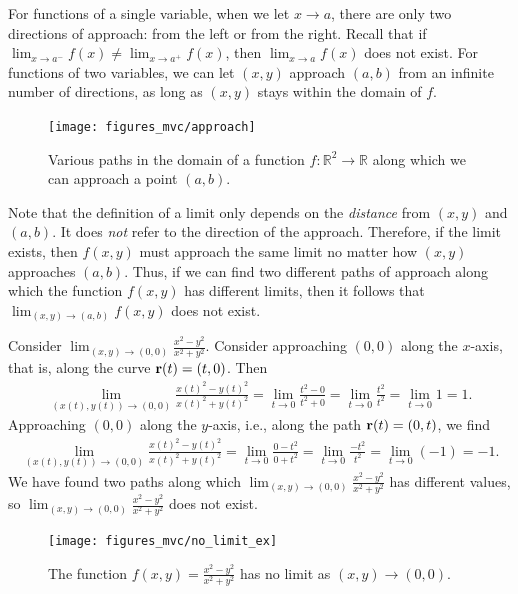 \documentclass[12pt,letterpaper,reqno]{article}
\numberwithin{equation}{section}
\newcommand{\R}{\ensuremath{\mathbb R}}
\newcommand{\bbr}{{\bf r}}
\begin{document}
{For functions of a single variable, when we let $x \to a$, there are only two directions of approach: from the left or from the right. Recall that if $\lim_{x \to a^-}f(x) \neq \lim_{x \to a^+}f(x)$, then $\lim_{x \to a}f(x)$ does not exist. For functions of two variables, we can let $(x,y)$ approach $(a,b)$ from an infinite number of directions, as long as $(x,y)$ stays within the domain of $f$.
	
\begin{figure}[h]
	\begin{center}
		\texttt{[image: figures\_mvc/approach]}
	\end{center}
	\caption{Various paths in the domain of a function $f:\R^2 \to \R$ along which we can approach a point $(a,b)$.}
\end{figure}	
	
	
Note that the definition of a limit only depends on the \emph{distance} from $(x,y)$ and $(a,b)$. It does \emph{not} refer to the direction of the approach. Therefore, if the limit exists, then $f(x,y)$ must approach the same limit no matter how $(x,y)$ approaches $(a,b)$. Thus, if we can find two different paths of approach along which the function $f(x,y)$ has different limits, then it follows that $\lim_{(x,y) \to (a,b)}f(x,y)$ does not exist.

\begin{example}
Consider $\lim_{(x,y) \to (0,0)}\frac{x^2-y^2}{x^2+y^2}$. Consider approaching $(0,0)$ along the $x$-axis, that is, along the curve $\bbr(t)=(t,0)$. Then
\begin{align*}
	\lim_{(x(t),y(t)) \to (0,0)}\frac{x(t)^2-y(t)^2}{x(t)^2+y(t)^2}=\lim_{t \to 0}\frac{t^2-0}{t^2+0}=\lim_{t \to 0}\frac{t^2}{t^2}=\lim_{t \to 0}1=1.
\end{align*}
Approaching $(0,0)$ along the $y$-axis, i.e., along the path $\bbr(t)=(0,t)$, we find
	\begin{align*}
	\lim_{(x(t),y(t)) \to (0,0)}\frac{x(t)^2-y(t)^2}{x(t)^2+y(t)^2}=\lim_{t \to 0}\frac{0-t^2}{0+t^2}=\lim_{t \to 0}\frac{-t^2}{t^2}=\lim_{t \to 0}(-1)=-1.
\end{align*}
We have found two paths along which $\lim_{(x,y) \to (0,0)}\frac{x^2-y^2}{x^2+y^2}$ has different values, so $\lim_{(x,y) \to (0,0)}\frac{x^2-y^2}{x^2+y^2}$ does not exist.
\end{example}

\begin{figure}[h]
	\begin{center}
		\texttt{[image: figures\_mvc/no\_limit\_ex]}
	\end{center}
	\caption{The function $f(x,y)=\frac{x^2-y^2}{x^2+y^2}$ has no limit as $(x,y) \to (0,0)$.}
\end{figure}

}
\end{document}
